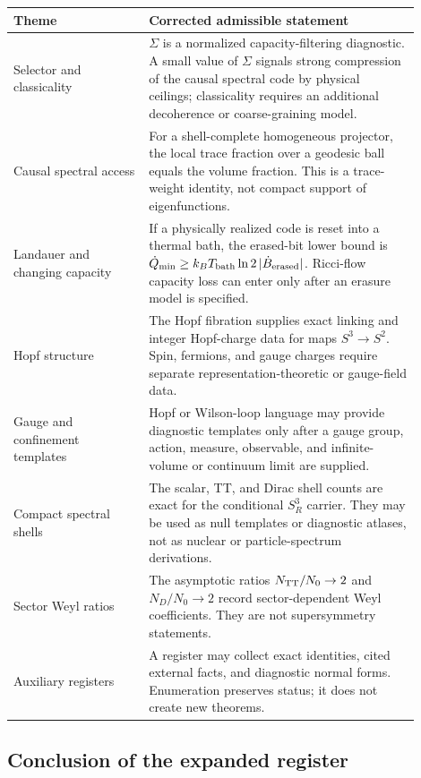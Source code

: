 \documentclass[11pt,a4paper]{article}
\begin{document}
\begin{center}
\small
\begin{tabular}{p{0.30\linewidth}p{0.60\linewidth}}
\toprule
Theme & Corrected admissible statement\\
\midrule
Selector and classicality &
\(\Sigma\) is a normalized capacity-filtering diagnostic.  A small value of \(\Sigma\) signals strong compression of the causal spectral code by physical ceilings; classicality requires an additional decoherence or coarse-graining model.\\
Causal spectral access &
For a shell-complete homogeneous projector, the local trace fraction over a geodesic ball equals the volume fraction.  This is a trace-weight identity, not compact support of eigenfunctions.\\
Landauer and changing capacity &
If a physically realized code is reset into a thermal bath, the erased-bit lower bound is \( \dot Q_{\min}\ge k_BT_{\rm bath}\ln2\,|\dot B_{\rm erased}| \).  Ricci-flow capacity loss can enter only after an erasure model is specified.\\
Hopf structure &
The Hopf fibration supplies exact linking and integer Hopf-charge data for maps \(S^3\to S^2\).  Spin, fermions, and gauge charges require separate representation-theoretic or gauge-field data.\\
Gauge and confinement templates &
Hopf or Wilson-loop language may provide diagnostic templates only after a gauge group, action, measure, observable, and infinite-volume or continuum limit are supplied.\\
Compact spectral shells &
The scalar, TT, and Dirac shell counts are exact for the conditional \(S^3_R\) carrier.  They may be used as null templates or diagnostic atlases, not as nuclear or particle-spectrum derivations.\\
Sector Weyl ratios &
The asymptotic ratios \(N_{\rm TT}/N_0\to2\) and \(N_D/N_0\to2\) record sector-dependent Weyl coefficients.  They are not supersymmetry statements.\\
Auxiliary registers &
A register may collect exact identities, cited external facts, and diagnostic normal forms.  Enumeration preserves status; it does not create new theorems.\\
\bottomrule
\end{tabular}
\end{center}
\subsection{Conclusion of the expanded register}
\end{document}
